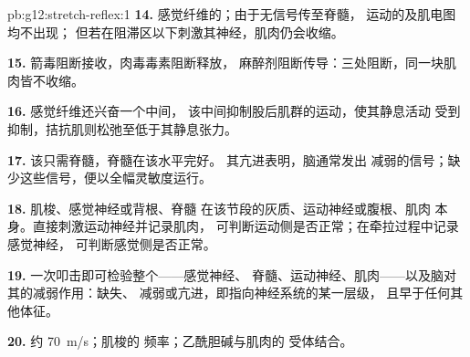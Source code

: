 \begin{solution}{pb:g12:stretch-reflex:1}
\textbf{14.} 感觉纤维的；由于无信号传至脊髓，
运动的及肌电图均不出现；
但若在阻滞区以下刺激其神经，肌肉仍会收缩。

\textbf{15.} 箭毒阻断接收，肉毒毒素阻断释放，
麻醉剂阻断传导：三处阻断，同一块肌肉皆不收缩。

\textbf{16.} 感觉纤维还兴奋一个中间，
该中间抑制股后肌群的运动，使其静息活动
受到抑制，拮抗肌则松弛至低于其静息张力。

\textbf{17.} 该只需脊髓，脊髓在该水平完好。
其亢进表明，脑通常发出
减弱的信号；缺少这些信号，便以全幅灵敏度运行。

\textbf{18.} 肌梭、感觉神经或背根、脊髓
在该节段的灰质、运动神经或腹根、肌肉
本身。直接刺激运动神经并记录肌肉，
可判断运动侧是否正常；在牵拉过程中记录感觉神经，
可判断感觉侧是否正常。

\textbf{19.} 一次叩击即可检验整个——感觉神经、
脊髓、运动神经、肌肉——以及脑对其的减弱作用：缺失、
减弱或亢进，即指向神经系统的某一层级，
且早于任何其他体征。

\textbf{20.} 约 \qty{70}{m/s}；肌梭的
频率；乙酰胆碱与肌肉的
受体结合。
\end{solution}
